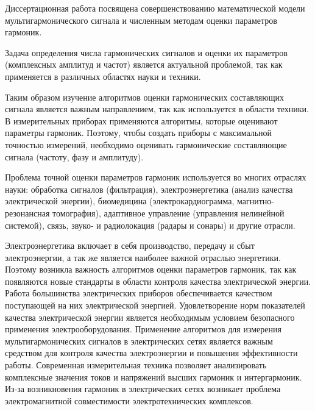 {\actuality} 
Диссертационная работа посвящена совершенствованию математической модели мультигармонического сигнала и численным методам оценки параметров гармоник. 

Задача определения числа гармонических сигналов
и оценки их параметров (комплексных амплитуд и частот) является актуальной проблемой, так как применяется в различных областях науки и техники.

Таким образом изучение алгоритмов оценки гармонических составляющих 
сигнала является важным направлением, так как используется в области техники. В измерительных приборах применяются алгоритмы, которые оценивают параметры гармоник. Поэтому, чтобы создать приборы с максимальной точностью измерений, необходимо оценивать гармонические составляющие сигнала (частоту, фазу и амплитуду). 
 
Проблема точной оценки параметров гармоник используется во многих отраслях науки: обработка сигналов (фильтрация), электроэнергетика (анализ качества электрической энергии), биомедицина (электрокардиограмма, магнитно-резонансная томография), адаптивное управление (управления нелинейной системой), связь, звуко- и радиолокация (радары и сонары) и другие отрасли. 

Электроэнергетика включает в себя производство, передачу и сбыт электроэнергии, а так же является наиболее важной отраслью энергетики. Поэтому возникла важность алгоритмов оценки параметров гармоник, так как появляются новые стандарты в области контроля качества электрической энергии. Работа большинства электрических приборов обеспечивается качеством поступающей на них электрической энергией. Удовлетворение норм показателей качества электрической энергии является необходимым условием безопасного применения электрооборудования. 
Применение алгоритмов для измерения мультигармонических сигналов в электрических сетях является важным средством для контроля качества электроэнергии и повышения эффективности работы. Современная измерительная техника позволяет анализировать комплексные значения токов и напряжений высших гармоник и интергармоник. Из-за возникновения гармоник в электрических сетях возникает проблема электромагнитной совместимости электротехнических комплексов. 

